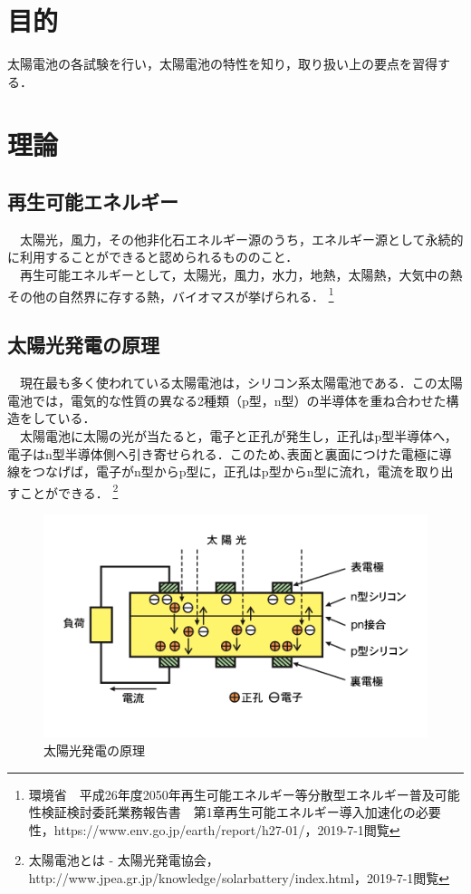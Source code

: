

\pagestyle{fancy}
\section{目的}
太陽電池の各試験を行い，太陽電池の特性を知り，取り扱い上の要点を習得する．\\

\section{理論}
\subsection{再生可能エネルギー}
　太陽光，風力，その他非化石エネルギー源のうち，エネルギー源として永続的に利用することができると認められるもののこと．\\
　再生可能エネルギーとして，太陽光，風力，水力，地熱，太陽熱，大気中の熱その他の自然界に存する熱，バイオマスが挙げられる．
\footnote{環境省　平成26年度2050年再生可能エネルギー等分散型エネルギー普及可能性検証検討委託業務報告書　第1章再生可能エネルギー導入加速化の必要性，https://www.env.go.jp/earth/report/h27-01/，2019-7-1閲覧}


\subsection{太陽光発電の原理}
　現在最も多く使われている太陽電池は，シリコン系太陽電池である．この太陽電池では，電気的な性質の異なる2種類（p型，n型）の半導体を重ね合わせた構造をしている．\\
　太陽電池に太陽の光が当たると，電子と正孔が発生し，正孔はp型半導体へ，電子はn型半導体側へ引き寄せられる．このため､表面と裏面につけた電極に導線をつなげば，電子がn型からp型に，正孔はp型からn型に流れ，電流を取り出すことができる．
\footnote{太陽電池とは - 太陽光発電協会，http://www.jpea.gr.jp/knowledge/solarbattery/index.html，2019-7-1閲覧}
\begin{figure}[H]
  \centering
  \includegraphics[width=13cm]{./fig/fig01.png}
  \caption{太陽光発電の原理}
\end{figure}

